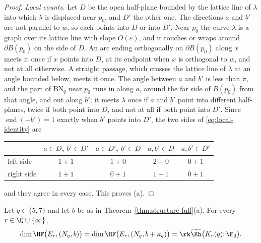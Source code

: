 \begin{proof}
\emph{Local counts.}  Let $D$ be the open half-plane bounded by the lattice line of $\lambda$ into
which $\lambda$ is displaced near $p_0$, and $D'$ the other one.  The directions $a$ and $b'$ are not
parallel to $w$, so each points into $D$ or into $D'$.  Near $p_0$ the curve $\lambda$ is a graph over its lattice
line with slope $O(\varepsilon)$, and it touches or wraps around $\partial B(p_0)$ on the side of $D$.  An arc ending orthogonally on $\partial B(p_0)$ along $x$ meets it once
if $x$ points into $D$, at its endpoint when $x$ is orthogonal to $w$, and not at all otherwise.  A straight passage, which crosses the lattice line of
$\lambda$ at an angle bounded below, meets it once.  The angle between $a$ and $b'$ is less than $\pi$, and
the part of $\mathrm{BN}_q$ near $p_0$ runs in along $a$, around the far side of $B(p_0)$ from that
angle, and out along $b'$; it meets $\lambda$ once if $a$ and $b'$ point into different half-planes,
twice if both point into $D$, and not at all if both point into $D'$.  Since
$\operatorname{end}(-b')=1$ exactly when $b'$ points into $D'$, the two sides of
\eqref{eq:local-identity} are
\begin{center}
\begin{tabular}{lcccc}
\toprule
 & $a\in D$, $b'\in D'$ & $a\in D'$, $b'\in D$ & $a,b'\in D$ & $a,b'\in D'$\\
\midrule
left side & $1+1$ & $1+0$ & $2+0$ & $0+1$\\
right side & $1+1$ & $0+1$ & $1+1$ & $0+1$\\
\bottomrule
\end{tabular}
\end{center}
and they agree in every case.  This proves (a).
\end{proof}

\begin{corollary}\label{cor:closures-full}
Let $q\in\{5,7\}$ and let $b$ be as in Theorem~\ref{thm:structure-full}(a).  For every
$r\in\Q\cup\{\infty\}$,
\[
 \dim\HF\bigl(E_r,(N_q,b)\bigr)=\dim\HF\bigl(E_r,(N_q,b+\kappa_q)\bigr)=\rk\widetilde{\Kh}\bigl(K_r(q);\F_2\bigr).
\]
\end{corollary}

